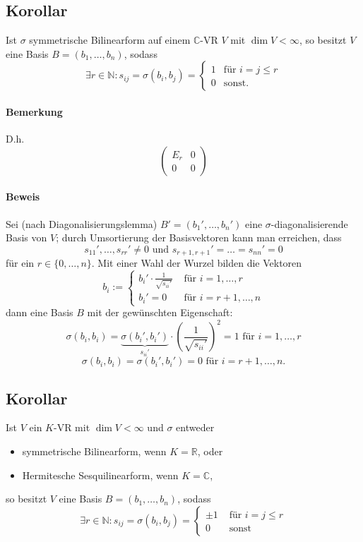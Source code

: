 \subsection{Korollar}
\begin{Korollar}[]
	Ist $ \sigma $ symmetrische Bilinearform auf einem $ \mathbb{C} $-VR $ V $ mit $ \dim V < \infty $, so besitzt $ V $ eine Basis $ B = (b_1,\dots,b_n) $, sodass
		\[ \exists r\in \mathbb{N}: s_{ij} = \sigma(b_i,b_j) = \begin{cases}
		1 & \text{für } i = j \leq r\\
		0 & \text{sonst}.
		\end{cases} \]
\end{Korollar}

\paragraph{Bemerkung}
	D.h.
		\[ \begin{pmatrix}
		E_r & 0 \\ 0 & 0
		\end{pmatrix} \]
\paragraph{Beweis}
	Sei (nach Diagonalisierungslemma) $ B' = (b_1',\dots,b_n') $ eine $ \sigma$-diagonalisierende Basis von $ V $; durch Umsortierung der Basisvektoren kann man erreichen, dass
		\[ s_{11}' ,\dots, s_{rr}' \neq 0 \text{ und } s_{r+1,r+1}' = \dots = s_{nn}' = 0 \]
	für ein $ r\in \{0,\dots,n\} $. Mit einer Wahl der Wurzel bilden die Vektoren 
		\[ b_i := \begin{cases}
		{b_i'}\cdot \frac{1}{\sqrt{s_{ii}'}} & \text{ für } i = 1,\dots,r\\
		b_i' = 0 & \text{ für } i = r+1,\dots,n 
		\end{cases} \]
	dann eine Basis $ B $ mit der gewünschten Eigenschaft:
		\[ \sigma(b_i,b_i) = \underset{s_{ii}'}{\underbrace{\sigma(b_i',b_i')}} \cdot \left(\frac{1}{\sqrt{s_{ii}'}}\right)^2 = 1 \text{ für } i = 1,\dots,r\]
		\[ \sigma(b_i,b_i) = \sigma(b_i',b_i') = 0 \text{ für } i = r+1,\dots, n. \]
		
\subsection{Korollar}
\begin{Korollar}[]
	Ist $ V $ ein $ K $-VR mit $ \dim V <\infty $ und $ \sigma $ entweder
		\begin{itemize}
			\item symmetrische Bilinearform, wenn $ K=\mathbb{R} $, oder
			\item Hermitesche Sesquilinearform, wenn $ K = \mathbb{C} $,
		\end{itemize}
	so besitzt $ V $ eine Basis $ B = (b_1,\dots,b_n) $, sodass
		\[ \exists r\in \mathbb{N}: s_{ij} = \sigma(b_i,b_j) =
		\begin{cases}
			\pm 1 & \text{ für }i = j \leq r\\
			0 & \text{ sonst}
		\end{cases} \]
\end{Korollar}
